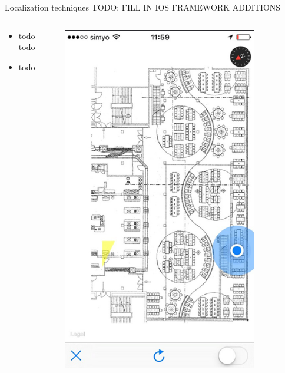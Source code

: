 \documentclass[11pt]{beamer}
\begin{document}
\begin{frame}[t]{Localization techniques}
  TODO: FILL IN IOS FRAMEWORK ADDITIONS
  \begin{columns}[t]
    \begin{column}[b]{0.7\textwidth}
      \begin{itemize}
        \setlength{\itemsep}{1pt}
        \setlength{\parskip}{0pt}
        \setlength{\parsep}{0pt}
        \item todo todo
        \item todo
      \end{itemize}
    \end{column}
    \hfill
    \begin{column}{0.3\textwidth}
      \includegraphics[width=0.8\textwidth]{appleframework}%
    \end{column}
  \end{columns}

\end{frame}
\end{document}
